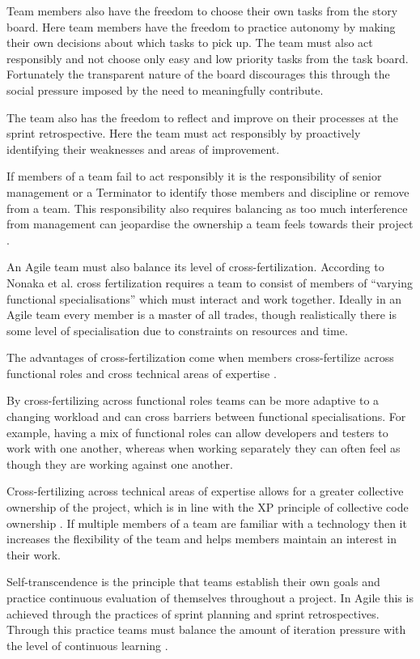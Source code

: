 \documentclass[conference]{IEEEtran}
\begin{document}
Team members also have the freedom to choose their own tasks from the story
board. Here team members have the freedom to practice autonomy by making their
own decisions about which tasks to pick up. The team must also act responsibly
and not choose only easy and low priority tasks from the task board. Fortunately
the transparent nature of the board discourages this through the social pressure
imposed by the need to meaningfully contribute.

The team also has the freedom to reflect and improve on their processes at the
sprint retrospective. Here the team must act responsibly by proactively
identifying their weaknesses and areas of improvement.

If members of a team fail to act responsibly it is the responsibility of senior
management or a Terminator \cite{hoda2010organizing} to identify those members
and discipline or remove from a team. This responsibility also requires
balancing as too much interference from management can jeopardise the ownership
a team feels towards their project \cite{hoda2010balancing}.

An Agile team must also balance its level of cross-fertilization. According to
Nonaka et al. cross fertilization requires a team to consist of members of
``varying functional specialisations'' which must interact and work together.
Ideally in an Agile team every member is a master of all trades, though
realistically there is some level of specialisation due to constraints on
resources and time.

The advantages of cross-fertilization come when members cross-fertilize across
functional roles and cross technical areas of expertise
\cite{hoda2010balancing}.

By cross-fertilizing across functional roles teams can be more adaptive to a
changing workload and can cross barriers between functional specialisations. For
example, having a mix of functional roles can allow developers and testers to
work with one another, whereas when working separately they can often feel as
though they are working against one another.

Cross-fertilizing across technical areas of expertise allows for a greater
collective ownership of the project, which is in line with the XP principle of
collective code ownership \cite{beck1999embracing}. If multiple members of a
team are familiar with a technology then it increases the flexibility of the
team and helps members maintain an interest in their work.

Self-transcendence is the principle that teams establish their own goals and
practice continuous evaluation of themselves throughout a project. In Agile this
is achieved through the practices of sprint planning and sprint retrospectives.
Through this practice teams must balance the amount of iteration pressure with
the level of continuous learning \cite{hoda2010balancing}.
\end{document}
